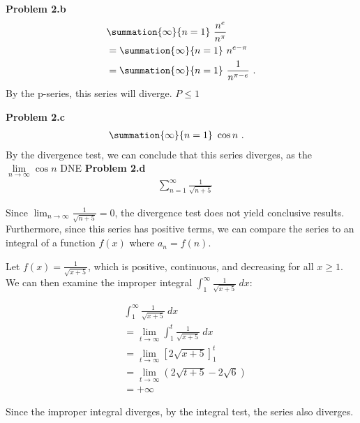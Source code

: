 \documentclass{report}
\begin{document}
    \pagebreak \bigbreak \noindent 
    \textbf{Problem 2.b}
    \begin{align*}
        &\summation{\infty}{n=1}\ \frac{n^{e}}{n^{\pi}}\  \\
        &=\summation{\infty}{n=1}\ n^{e-\pi}\  \\
        &=\summation{\infty}{n=1}\ \frac{1}{n^{\pi-e}}\ 
    .\end{align*}
    By the p-series, this series will diverge. $P \leq 1$

    \bigbreak \noindent 
    \textbf{Problem 2.c}
    \begin{align*}
        &\summation{\infty}{n=1}\ \cos{n}\ 
    .\end{align*}
    By the divergence test, we can conclude that this series diverges, as the $\lim\limits_{n \to \infty}{\cos{n}} $ DNE
    \bigbreak \noindent 
    \textbf{Problem 2.d}
    \begin{align*}
    &\sum_{n=1}^{\infty} \frac{1}{\sqrt{n+5}}
\end{align*}

\noindent
Since \(\lim_{n \to \infty} \frac{1}{\sqrt{n+5}} = 0\), the divergence test does not yield conclusive results. Furthermore, since this series has positive terms, we can compare the series to an integral of a function \(f(x)\) where \(a_n = f(n)\).

\noindent
Let \(f(x) = \frac{1}{\sqrt{x+5}}\), which is positive, continuous, and decreasing for all \(x \geq 1\). We can then examine the improper integral \(\int_{1}^{\infty} \frac{1}{\sqrt{x+5}}\ dx\):

\begin{align*}
    &\int_{1}^{\infty} \frac{1}{\sqrt{x+5}}\ dx \\
    &= \lim_{t \to \infty} \int_{1}^{t} \frac{1}{\sqrt{x+5}}\ dx \\
    &= \lim_{t \to \infty} \left[ 2\sqrt{x+5} \right]_{1}^{t} \\
    &= \lim_{t \to \infty} \left( 2\sqrt{t+5} - 2\sqrt{6} \right) \\
    &= +\infty
\end{align*}

\noindent
Since the improper integral diverges, by the integral test, the series also diverges.
\end{document}

